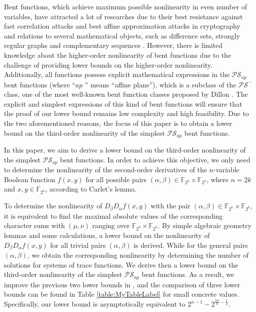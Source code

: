\documentclass[preprint,10pt]{elsarticle}
\newcommand{\F}{\mathbb{F}}
\newcommand{\0}{\textbf{0}}
\newcommand{\1}{\textbf{1}}
\theoremstyle{plain}
\begin{document}
    Bent functions, which achieve maximum possible nonlinearity in even number of variables,
    have attracted a lot of researches due to their best resistance against fast correlation attacks \cite{MS1988fast_correlation_attack} and best affine approximation attacks \cite{DingXS1991book} in cryptography and relations to several mathematical objects, such as difference sets, strongly regular graphs and complementary sequences \cite{Carlet2020book}.
    However, there is limited knowledge about the higher-order nonlinearity of bent functions due to the challenge of providing lower bounds on the higher-order nonlinearity.
    Additionally, all functions possess explicit mathematical expressions in the $\mathcal{PS}_{ap}$ bent functions (where ``$ap$ '' means ``affine plane''), which is a subclass of the $\mathcal{PS}^-$ class, one of the most well-known bent function classes proposed by Dillon \cite{Dillon1974PSbent}.
    The explicit and simplest expressions of this kind of bent functions will ensure that the proof of our lower bound remains low complexity and high feasibility.
    Due to the two aforementioned reasons,
    the focus of this paper is to obtain a lower bound on the third-order nonlinearity of the simplest $\mathcal{PS}_{ap}$ bent functions.

    In this paper, we aim to derive a lower bound on the third-order nonlinearity of the simplest $\mathcal{PS}_{ap}$ bent functions.
    In order to achieve this objective, we only need to determine the nonlinearity of the second-order derivatives of the $n$-variable Boolean function $f(x,y)$ for all possible pairs $(\alpha,\beta)\in\F_{2^k}\times\F_{2^k}$, where $n=2k$ and $x,y\in\F_{2^k}$, according to Carlet's lemma.
    
    To determine the nonlinearity of $D_{\beta}D_{\alpha}f(x,y)$ with the pair $(\alpha,\beta)\in\F_{2^k}\times\F_{2^k}$, it is equivalent to find the maximal absolute values of the corresponding character sums with $(\mu,\nu)$ ranging over $\F_{2^k}\times\F_{2^k}$.
    By simple algebraic geometry lemmas and some calculations, a lower bound on the nonlinearity of $D_{\beta}D_{\alpha}f(x,y)$ for all trivial pairs $(\alpha,\beta)$ is derived.
    While for the general pairs $(\alpha,\beta)$, we obtain the corresponding nonlinearity by determining the number of solutions for systems of trace functions.
    We derive then a lower bound on the third-order nonlinearity of the simplest $\mathcal{PS}_{ap}$ bent functions.
    As a result,
    we improve the previous two lower bounds in \cite{Carlet2011NL_Profile_Dillon,TangCT2013NL_2bent}, and the comparison of three lower bounds can be found in Table \ref{table:MyTableLabel} for small concrete values.
    Specifically, our lower bound is asymptotically equivalent to $2^{n-1}-2^{\frac{7n}{8}-\frac{1}{2}}$.
\end{document}
